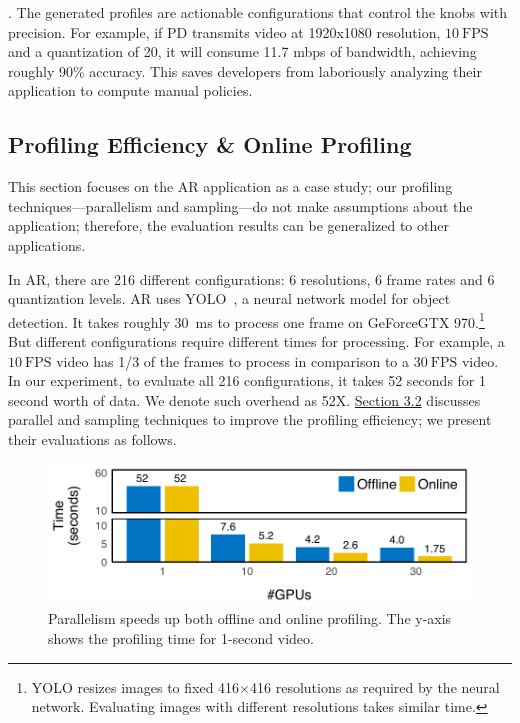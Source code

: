 . The generated profiles are actionable
configurations that control the knobs with precision. For example, if PD
transmits video at 1920x1080 resolution, \(10~\text{FPS}\) and a quantization of
20, it will consume 11.7 mbps of bandwidth, achieving roughly 90\%
accuracy. This saves developers from laboriously analyzing their application to
compute manual policies.

\subsection{Profiling Efficiency \& Online Profiling}
\label{sec:online-profiling}

This section focuses on the AR application as a case study; our profiling
techniques---parallelism and sampling---do not make assumptions about the
application; therefore, the evaluation results can be generalized to other
applications.

In AR, there are 216 different configurations: 6 resolutions, 6 frame rates and
6 quantization levels. AR uses YOLO~\cite{redmon2016yolo9000}, a neural network
model for object detection. It takes roughly \SI{30}{\ms} to process one frame
on GeForce\textregistered\space GTX 970.\footnote{YOLO resizes images to fixed
  416$\times$416 resolutions as required by the neural network. Evaluating
  images with different resolutions takes similar time.}  But different
configurations require different times for processing. For example, a
\(10~\text{FPS}\) video has 1/3 of the frames to process in comparison to a
\(30~\text{FPS}\) video.  In our experiment, to evaluate all 216 configurations,
it takes 52 seconds for 1 second worth of data. We denote such overhead as
52X\@. \hyperref[sec:automatic-profiling]{Section 3.2} discusses parallel and
sampling techniques to improve the profiling efficiency; we present their
evaluations as follows.

\begin{figure}
  \centering
  \includegraphics[width=0.8\columnwidth]{figures/parallel.pdf}
  \vspace{-1em}
  \caption{Parallelism speeds up both offline and online profiling.  The y-axis
    shows the profiling time for 1-second video.}
  \label{fig:parallel}
  \vspace{-0.5em}
\end{figure}

